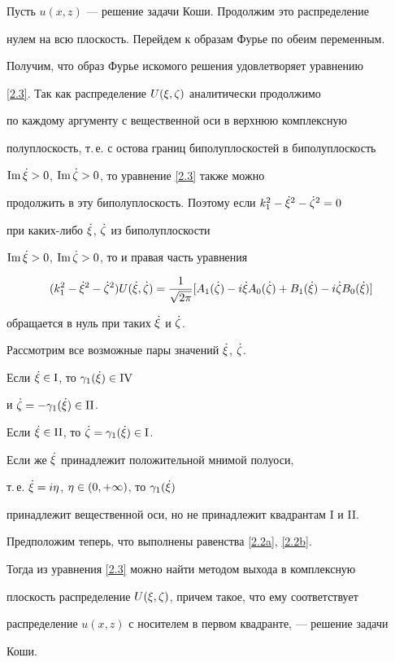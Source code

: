 \begin{pf}


Пусть $u(x,z)$ --- решение задачи Коши. Продолжим это распределение


нулем на всю плоскость. Перейдем к образам Фурье по обеим переменным.


Получим, что образ Фурье искомого решения удовлетворяет уравнению


\eqref{2.3}. Так как распределение $U(\xi,\zeta)$ аналитически продолжимо


по каждому аргументу с вещественной оси в верхнюю комплексную


полуплоскость, т.\,е. с остова границ биполуплоскостей в биполуплоскость


$\operatorname{Im}\Dot{\xi}>0$, $\operatorname{Im}\Dot{\zeta}>0$, то уравнение \eqref{2.3} также можно


продолжить в эту биполуплоскость. Поэтому если $k_1^2-\Dot{\xi}^2-\Dot{\zeta}^2=0$


при каких-либо $\Dot{\xi}$, $\Dot{\zeta}$ из биполуплоскости


$\operatorname{Im}\Dot{\xi}>0$, $\operatorname{Im}\Dot{\zeta}>0$, то и правая часть уравнения


\begin{equation}\label{2.4}


(k_1^2-\dxi ^2- \ddz^2)U(\dxi,\ddz)=\frac{1}{\sqrt{2\pi}}


[ A_1(\ddz)-i\dxi A_0(\ddz)


+B_1(\dxi)-i\ddz B_0(\dxi)]


\end{equation}


обращается в нуль при таких $\Dot{\xi}$ и $\Dot{\zeta}$.





Рассмотрим все возможные пары значений $\Dot{\xi}$, $\Dot{\zeta}$.


Если $\Dot{\xi}\in \mathrm I$, то $\gamma_1(\Dot{\xi})\in \mathrm{IV}$


и $\Dot{\zeta}=-\gamma_1(\Dot{\xi})\in \mathrm{II}$.


Если $\Dot{\xi}\in \mathrm{II}$, то $\Dot{\zeta}=\gamma_1(\Dot{\xi})\in \mathrm I$.


Если же $\Dot{\xi}$ принадлежит положительной мнимой полуоси,


т.\,е. $\Dot{\xi}=i\eta$, $\eta\in (0,+\infty)$, то $\gamma_1(\Dot{\xi})$


принадлежит вещественной оси, но не принадлежит квадрантам I и II.





Предположим теперь, что выполнены равенства \eqref{2.2a}, \eqref{2.2b}.


Тогда из уравнения \eqref{2.3} можно найти методом выхода в комплексную


плоскость распределение $U(\xi,\zeta)$, причем такое, что ему соответствует


распределение $u(x,z)$ с носителем в первом квадранте, --- решение задачи


Коши.


\end{pf}






